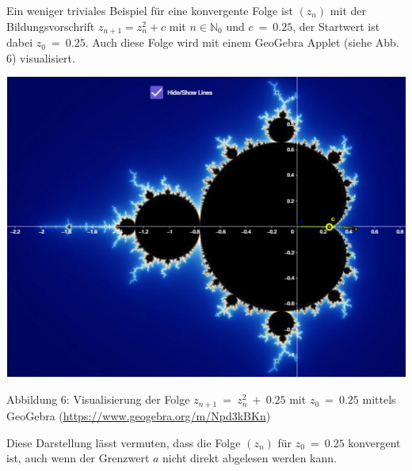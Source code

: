 \documentclass[a4paper, 12pt]{book}
\begin{document}
Ein weniger triviales Beispiel für eine konvergente Folge ist
\(\left( z_{n} \right)\) mit der Bildungsvorschrift
\(z_{n + 1} = z_{n}^{2} + c\) mit \(n \in \mathbb{N}_{0}\) und
\(c\  = \ 0.25\), der Startwert ist dabei \(z_{0}\  = \ 0.25\). Auch
diese Folge wird mit einem GeoGebra Applet (siehe Abb. 6) visualisiert.

\includegraphics[width=\linewidth]{image11.png}

\protect\hypertarget{_Toc167901656}{}{}Abbildung 6: Visualisierung der
Folge \(z_{n + 1}\  = \ z_{n}^{2}\  + \ 0.25\) mit \(z_{0}\  = \ 0.25\)
mittels GeoGebra (\url{https://www.geogebra.org/m/Npd3kBKn})

Diese Darstellung lässt vermuten, dass die Folge
\(\left( z_{n} \right)\) für \(z_{0}\  = \ 0.25\) konvergent ist, auch
wenn der Grenzwert \(a\) nicht direkt abgelesen werden kann.
\end{document}
